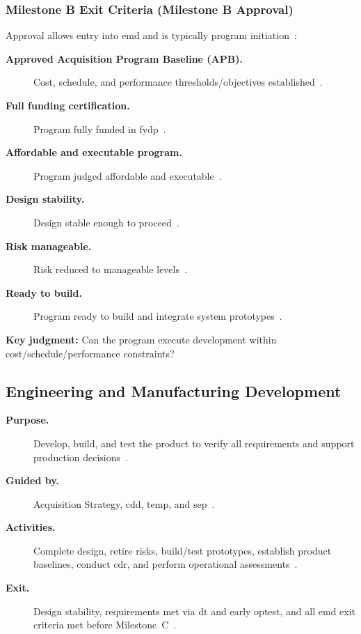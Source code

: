 \documentclass[../main.tex]{subfiles}
\begin{document}
\subsubsection{Milestone B Exit Criteria (Milestone B Approval)}
Approval allows entry into \ac{emd} and is typically program initiation~\autocite{DoDI5000-85,edo-3-3-2-acq-milestones-phases-2025}:
\begin{description}
  \item[\textbf{Approved Acquisition Program Baseline (APB).}] Cost, schedule, and performance thresholds/objectives established~\autocite{DoDI5000-85,edo-3-3-2-acq-milestones-phases-2025}.
  \item[\textbf{Full funding certification.}] Program fully funded in \ac{fydp}~\autocite{DoDI5000-85,edo-3-3-2-acq-milestones-phases-2025}.
  \item[\textbf{Affordable and executable program.}] Program judged affordable and executable~\autocite{DoDI5000-85,edo-3-3-2-acq-milestones-phases-2025}.
  \item[\textbf{Design stability.}] Design stable enough to proceed~\autocite{DoDI5000-85,DoD-EngineeringDefenseSystemsGuidebook-2024,edo-3-3-2-acq-milestones-phases-2025}.
  \item[\textbf{Risk manageable.}] Risk reduced to manageable levels~\autocite{DoDI5000-85,edo-3-3-2-acq-milestones-phases-2025}.
  \item[\textbf{Ready to build.}] Program ready to build and integrate system prototypes~\autocite{DoDI5000-85,edo-3-3-2-acq-milestones-phases-2025}.
\end{description}
\textbf{Key judgment:} Can the program execute development within cost/schedule/performance constraints?~\autocite{DoDI5000-85,edo-3-3-2-acq-milestones-phases-2025}

\subsection{Engineering and Manufacturing Development}
\begin{description}
  \item[\textbf{Purpose.}] Develop, build, and test the product to verify all requirements and support production decisions~\autocite{DoDI5000-85,edo-3-3-2-acq-milestones-phases-2025}.
  \item[\textbf{Guided by.}] Acquisition Strategy, \ac{cdd}, \ac{temp}, and \ac{sep}~\autocite{DoDI5000-85,DoDI5000-88,DoDI5000-89,edo-3-3-2-acq-milestones-phases-2025}.
  \item[\textbf{Activities.}] Complete design, retire risks, build/test prototypes, establish product baselines, conduct \ac{cdr}, and perform operational assessments~\autocite{DoDI5000-85,DoD-EngineeringDefenseSystemsGuidebook-2024,edo-3-3-2-acq-milestones-phases-2025}.
  \item[\textbf{Exit.}] Design stability, requirements met via \ac{dt} and early \ac{optest}, and all \ac{emd} exit criteria met before Milestone~C~\autocite{DoDI5000-85,DoDI5000-89,edo-3-3-2-acq-milestones-phases-2025}.
\end{description}
\end{document}
